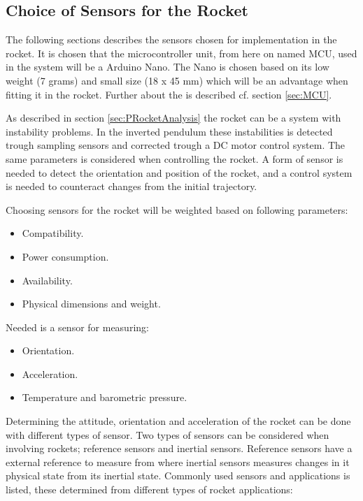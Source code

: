 \startexplain
{}
\stopexplain


\subsection{Choice of Sensors for the Rocket}
The following sections describes the sensors chosen for implementation in the rocket. It is chosen that the microcontroller unit, from here on named MCU, used in the system will be a Arduino Nano. The Nano is chosen based on its low weight (7 grams) and small size (18 x 45 mm) which will be an advantage when fitting it in the rocket. Further about the  is described cf. section \ref{sec:MCU}.    

As described in section \ref{sec:PRocketAnalysis} the rocket can be a system with instability problems. In the inverted pendulum these instabilities is detected trough sampling sensors and corrected trough a DC motor control system. The same parameters is considered when controlling the rocket. A form of sensor is needed to detect the orientation and position of the rocket, and a control system is needed to counteract changes from the initial trajectory.

Choosing sensors for the rocket will be weighted based on following parameters:

\begin{itemize}[noitemsep]
\item Compatibility.
\item Power consumption.
\item Availability. 
\item Physical dimensions and weight.
\end{itemize}

Needed is a sensor for measuring:
\begin{itemize}[noitemsep]
\item Orientation.
\item Acceleration.
\item Temperature and barometric pressure.
\end{itemize}

Determining the attitude, orientation and acceleration of the rocket can be done with different types of sensor. Two types of sensors can be considered when involving rockets; reference sensors and inertial sensors. Reference sensors have a external reference to measure from where inertial sensors measures changes in it physical state from its inertial state. Commonly used sensors and applications is listed, these determined from different types of rocket applications:

